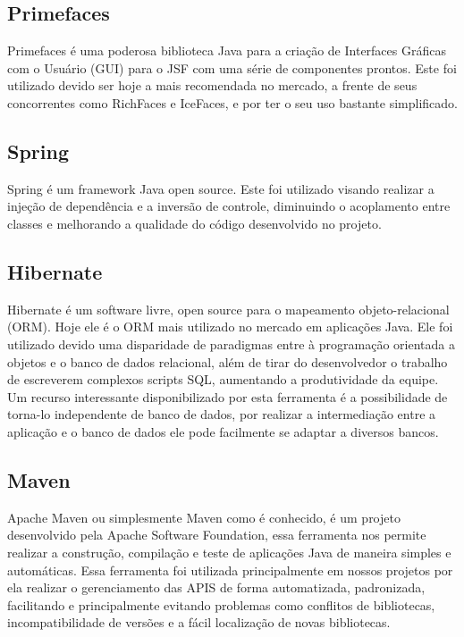 \subsection{Primefaces}
\label{sec:primefaces}

Primefaces é uma poderosa biblioteca Java para a criação de Interfaces Gráficas
com o Usuário (GUI) para o JSF com uma série de componentes prontos. Este foi
utilizado devido ser hoje a mais recomendada no mercado, a frente de seus
concorrentes como RichFaces e IceFaces, e por ter o seu uso bastante simplificado.


\subsection{Spring}
\label{sec:spring}

Spring é um framework Java open source. Este foi utilizado visando realizar a
injeção de dependência e a inversão de controle, diminuindo o acoplamento entre
classes e melhorando a qualidade do código desenvolvido no projeto.


\subsection{Hibernate}
\label{sec:hibernate}

Hibernate é um software livre, open source para o mapeamento objeto-relacional
(ORM). Hoje ele é o ORM mais utilizado no mercado em aplicações Java. Ele foi
utilizado devido uma disparidade de paradigmas entre à programação orientada a
objetos e o banco de dados relacional, além de tirar do desenvolvedor o trabalho
de escreverem complexos scripts SQL, aumentando a produtividade da equipe. Um
recurso interessante disponibilizado por esta ferramenta é a possibilidade de
torna-lo independente de banco de dados, por realizar a intermediação entre a
aplicação e o banco de dados ele pode facilmente se adaptar a diversos bancos.


\subsection{Maven}
\label{sec:maven}

Apache Maven ou simplesmente Maven como é conhecido, é um projeto desenvolvido
pela Apache Software Foundation, essa ferramenta nos permite realizar a
construção, compilação e teste de aplicações Java de maneira simples e
automáticas. Essa ferramenta foi utilizada principalmente em nossos projetos por
ela realizar o gerenciamento das APIS de forma automatizada, padronizada,
facilitando e principalmente evitando problemas como conflitos de bibliotecas,
incompatibilidade de versões e a fácil localização de novas bibliotecas.


